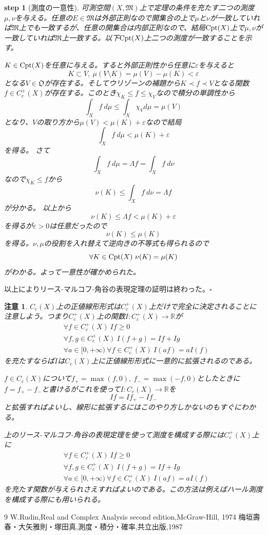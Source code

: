 \documentclass[leqno]{jsarticle}
\newtheorem*{cau}{注意}
\newtheorem{stp}{{\bf step}}
\newcommand{\rr}{\mathbb{R}}
\newcommand{\mgn}{\infty}
\newcommand{\mm}{\mathfrak{M}}
\newcommand{\la}{\Lambda}
\newcommand{\ep}{\varepsilon}
\newcommand{\cpt}{{\rm Cpt}(X)}
\newcommand{\oo}{\mathfrak{O}}
\newcommand{\fnct}{C_c(X)}
\newcommand{\praf}{C_c^{+}(X)}
\begin{document}
\begin{stp}[測度の一意性]\label{13}
可測空間$(X,\mm)$上で定理の条件を充たす二つの測度$\mu,\nu$を与える。任意の$E\in \mm$は外部正則なので開集合の上で$\mu$と$\nu$が一致していれば$\mm$上でも一致するが、任意の開集合は内部正則なので、結局$\cpt$上で$\mu,\nu$が一致していれば$\mm$上一致する。以下$\cpt$上二つの測度が一致することを示す。\par
$K\in \cpt $を任意に与える。すると外部正則性から任意に$\ep $を与えると
\[
K\subset V,\ \mu(V\setminus K)=\mu(V)-\mu(K)<\ep
\]
となる$V\in \oo$が存在する。そしてウリゾーンの補題から$K\prec f\prec V$となる関数$f\in \praf $が存在する。このとき$\chi_{K}\le f\le \chi_V$なので積分の単調性から
\[
\int_X f \ d\mu\le\int_{X}\chi_{V}d\mu=\mu(V)
\]
となり、$V$の取り方から$\mu(V)<\mu(K)+\ep$なので結局
\[
\int_X f \ d\mu<\mu(K)+\ep
\]
を得る。
さて
\[
\int_X f\ d\mu =\la f=\int_X f\ d\nu
\]
なので$\chi_K\le f$から
\[
\nu(K)\le \int_X f\ d\nu=\la f
\]
が分かる。
以上から
\[
\nu(K)\le \la f<\mu(K)+\ep
\]
を得るが$\ep>0$は任意だったので
\[
\nu(K)\le \mu(K)
\]
を得る。$\nu,\mu$の役割を入れ替えて逆向きの不等式も得られるので
\[
\forall K\in \cpt\ \nu(K)=\mu(K)
\]
がわかる。よって一意性が確かめられた。
\end{stp}

以上によりリース-マルコフ-角谷の表現定理の証明は終わった。$\square$

\setcounter{equation}{0}
\begin{cau}
$\fnct$上の正値線形形式は$\praf$上だけで完全に決定されることに注意しよう。つまり$\praf$上の関数$I:\praf \to \rr$が
\begin{eqnarray}
&\forall f\in \praf\ If \ge 0\\ 
&\forall f,g\in \praf\ I(f+g)=If+Ig\\ 
&\forall a\in [0,+\mgn)\ \forall f\in \praf\ I(af)=aI(f)
\end{eqnarray}
を充たすならば$I$は$\fnct$上に正値線形形式に一意的に拡張されるのである。\par
$f\in \fnct$について$f_{+}=\max(f,0),\ f_{-}=\max(-f,0)$としたときに$f=f_{+}-f_{-}$と書けるがこれを使って$I:\fnct \to \rr$を
\[
If=If_{+}-If_{-}
\]
と拡張すればよいし、線形に拡張するにはこのやり方しかないのもすぐにわかる。\par
上のリース-マルコフ-角谷の表現定理を使って測度を構成する際には$\praf$上に
\setcounter{equation}{0}
\begin{eqnarray}
&\forall f\in \praf\ If \ge 0\\ 
&\forall f,g\in \praf\ I(f+g)=If+Ig\\ 
&\forall a\in [0,+\mgn)\ \forall f\in \praf\ I(af)=aI(f)
\end{eqnarray}
を充たす関数が与えられさえすればよいのである。この方法は例えばハール測度を構成する際にも用いられる。
\end{cau}


\begin{thebibliography}{9}
W.Rudin,Real and Complex Analysis second edition,McGraw-Hill, 1974
梅垣壽春・大矢雅則・塚田真,測度・積分・確率,共立出版,1987
\end{thebibliography}
\end{document}
